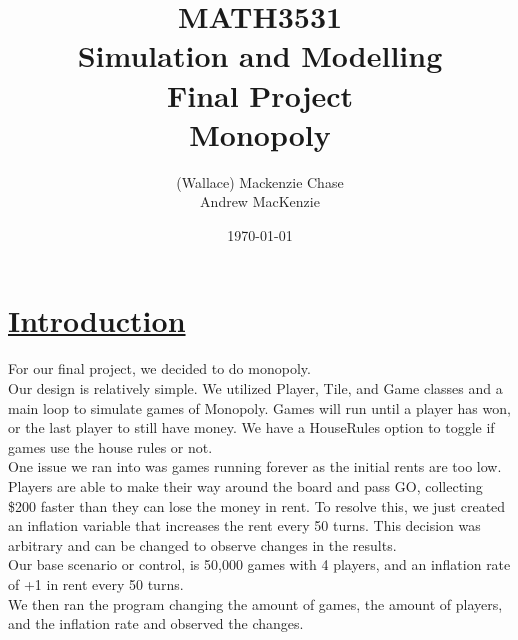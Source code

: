 \documentclass[a4paper,reqno,12pt]{report}
\begin{document}
\title{%
  MATH3531\\
  Simulation and Modelling\\
  Final Project\\
  Monopoly
  }
\author{(Wallace) Mackenzie Chase\\
Andrew MacKenzie}
\date{\today}
\maketitle
\clearpage

\section*{\underline{Introduction}}
For our final project, we decided to do monopoly.
\\
Our design is relatively simple. We utilized Player, Tile, and Game classes and a main loop to simulate games of Monopoly.
Games will run until a player has won, or the last player to still have money. We have a HouseRules option to toggle if games use the house rules or not.\\
One issue we ran into was games running forever as the initial rents are too low. Players are able to make their way around the board and pass GO, collecting \$200 faster than they can lose the money in rent. To resolve this, we just created an inflation variable that increases the rent every 50 turns. This decision was arbitrary and can be changed to observe changes in the results.
\\
Our base scenario or control, is 50,000 games with 4 players, and an inflation rate of +1 in rent every 50 turns.
\\
We then ran the program changing the amount of games, the amount of players, and the inflation rate and observed the changes.
\end{document}
